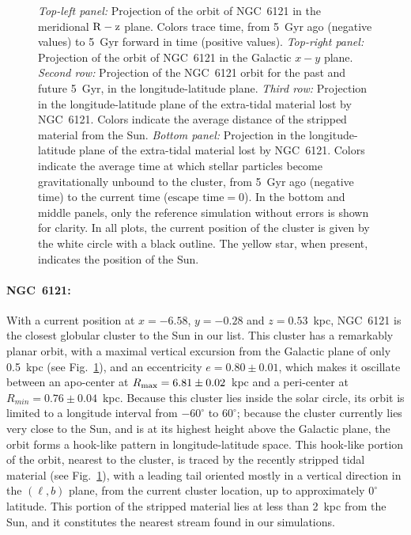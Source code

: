\begin{figure}
                \caption[Orbit and stream comparisons projected into Galactic coordinates]{ \emph{Top-left panel:} Projection of the orbit of NGC~6121 in the meridional $\rm R-z$ plane. Colors trace time, from 5~Gyr ago (negative values) to 5~Gyr forward in time (positive values). \emph{Top-right panel:} Projection of the orbit of NGC~6121 in the Galactic $x-y$ plane.  \emph{Second row:} Projection of the NGC~6121 orbit for the past and future 5~Gyr, in the longitude-latitude plane.   \emph{Third row:} Projection in the longitude-latitude plane of the extra-tidal material lost by NGC~6121. Colors indicate the average distance of the stripped material from the Sun.  \emph{Bottom panel:} Projection in the longitude-latitude plane of the extra-tidal material lost by NGC~6121. Colors indicate the average time at which stellar particles become gravitationally unbound to the cluster, from 5~Gyr ago (negative time) to the current time ($\textrm{escape time} = 0$). In the bottom and middle panels, only the reference simulation without errors is shown for clarity. In all plots, the current position of the cluster is given by the white circle with a black outline. The yellow star, when present, indicates the position of the Sun. }\label{ngc6121_stream}
            \end{figure}
            \onecolumn


            \paragraph{NGC~6121: }

            With a current position at $x=-6.58$, $y=-0.28$ and $z=0.53$~kpc, NGC~6121 is the closest globular cluster to the Sun in our list. This cluster has a  remarkably planar orbit, with a maximal vertical excursion from the Galactic plane of only 0.5~kpc (see  Fig.~\ref{ngc6121_stream}), and an eccentricity $e=0.80 \pm 0.01$, which makes it oscillate between an apo-center at $R_{\rm max}=6.81 \pm 0.02$~kpc and a peri-center at $R_{min}=0.76 \pm 0.04$~kpc. Because this cluster lies inside the solar circle, its orbit is limited to a longitude interval from $-60^{\circ}$ to $60^{\circ}$; because the cluster currently lies very close to the Sun, and is at its highest height above the Galactic plane, the orbit forms a hook-like pattern in longitude-latitude space. This hook-like portion of the orbit, nearest to the cluster, is traced by the recently stripped tidal material (see Fig.~\ref{ngc6121_stream}), with a leading tail oriented mostly in a vertical direction in the $(\ell,b)$ plane, from the current cluster location, up to approximately $0^\circ$ latitude. This portion of the stripped material lies at less than 2~kpc from the Sun, and it constitutes the nearest stream found in our simulations.

